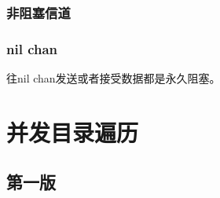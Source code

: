 \hypertarget{ux975eux963bux585eux4fe1ux9053}{%
\subsubsection{非阻塞信道}\label{ux975eux963bux585eux4fe1ux9053}}

\begin{Shaded}
\begin{Highlighting}[]
\NormalTok{ \{}
\NormalTok{)}
\NormalTok{:}
\NormalTok{\}}
\end{Highlighting}
\end{Shaded}

\hypertarget{nil-chan}{%
\subsubsection{nil chan}\label{nil-chan}}

往nil chan发送或者接受数据都是永久阻塞。

\begin{Shaded}
\begin{Highlighting}[]
\NormalTok{ <- } 
\NormalTok{<- }        
\end{Highlighting}
\end{Shaded}

\hypertarget{ux5e76ux53d1ux76eeux5f55ux904dux5386}{%
\section{并发目录遍历}\label{ux5e76ux53d1ux76eeux5f55ux904dux5386}}

\hypertarget{ux7b2cux4e00ux7248-1}{%
\subsection{第一版}\label{ux7b2cux4e00ux7248-1}}

